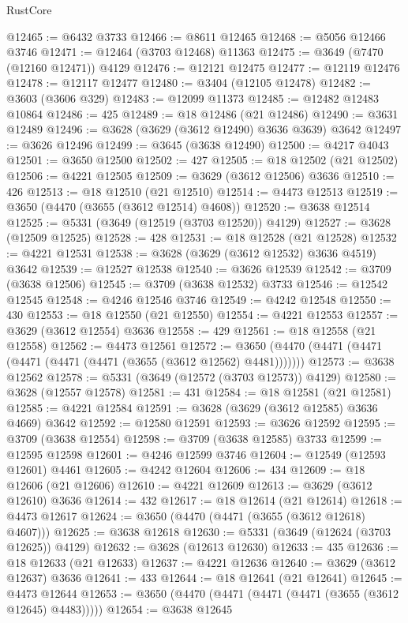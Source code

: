 \begin{lexlean}{RustCore}
\begin{coremodule}
@12465 := @6432 @3733
@12466 := @8611 @12465
@12468 := @5056 @12466 @3746
@12471 := @12464 (@3703 @12468) @11363
@12475 := @3649 (@7470 (@12160 @12471)) @4129
@12476 := @12121 @12475
@12477 := @12119 @12476
@12478 := @12117 @12477
@12480 := @3404 (@12105 @12478)
@12482 := @3603 (@3606 @329)
@12483 := @12099 @11373
@12485 := @12482 @12483 @10864
@12486 := 425
@12489 := @18 @12486 (@21 @12486)
@12490 := @3631 @12489
@12496 := @3628 (@3629 (@3612 @12490) @3636 @3639) @3642
@12497 := @3626 @12496
@12499 := @3645 (@3638 @12490)
@12500 := @4217 @4043
@12501 := @3650 @12500
@12502 := 427
@12505 := @18 @12502 (@21 @12502)
@12506 := @4221 @12505
@12509 := @3629 (@3612 @12506) @3636
@12510 := 426
@12513 := @18 @12510 (@21 @12510)
@12514 := @4473 @12513
@12519 := @3650 (@4470 (@3655 (@3612 @12514) @4608))
@12520 := @3638 @12514
@12525 := @5331 (@3649 (@12519 (@3703 @12520)) @4129)
@12527 := @3628 (@12509 @12525)
@12528 := 428
@12531 := @18 @12528 (@21 @12528)
@12532 := @4221 @12531
@12538 := @3628 (@3629 (@3612 @12532) @3636 @4519) @3642
@12539 := @12527 @12538
@12540 := @3626 @12539
@12542 := @3709 (@3638 @12506)
@12545 := @3709 (@3638 @12532) @3733
@12546 := @12542 @12545
@12548 := @4246 @12546 @3746
@12549 := @4242 @12548
@12550 := 430
@12553 := @18 @12550 (@21 @12550)
@12554 := @4221 @12553
@12557 := @3629 (@3612 @12554) @3636
@12558 := 429
@12561 := @18 @12558 (@21 @12558)
@12562 := @4473 @12561
@12572 := @3650 (@4470 (@4471 (@4471 (@4471 (@4471 (@4471 (@3655 (@3612 @12562) @4481)))))))
@12573 := @3638 @12562
@12578 := @5331 (@3649 (@12572 (@3703 @12573)) @4129)
@12580 := @3628 (@12557 @12578)
@12581 := 431
@12584 := @18 @12581 (@21 @12581)
@12585 := @4221 @12584
@12591 := @3628 (@3629 (@3612 @12585) @3636 @4669) @3642
@12592 := @12580 @12591
@12593 := @3626 @12592
@12595 := @3709 (@3638 @12554)
@12598 := @3709 (@3638 @12585) @3733
@12599 := @12595 @12598
@12601 := @4246 @12599 @3746
@12604 := @12549 (@12593 @12601) @4461
@12605 := @4242 @12604
@12606 := 434
@12609 := @18 @12606 (@21 @12606)
@12610 := @4221 @12609
@12613 := @3629 (@3612 @12610) @3636
@12614 := 432
@12617 := @18 @12614 (@21 @12614)
@12618 := @4473 @12617
@12624 := @3650 (@4470 (@4471 (@3655 (@3612 @12618) @4607)))
@12625 := @3638 @12618
@12630 := @5331 (@3649 (@12624 (@3703 @12625)) @4129)
@12632 := @3628 (@12613 @12630)
@12633 := 435
@12636 := @18 @12633 (@21 @12633)
@12637 := @4221 @12636
@12640 := @3629 (@3612 @12637) @3636
@12641 := 433
@12644 := @18 @12641 (@21 @12641)
@12645 := @4473 @12644
@12653 := @3650 (@4470 (@4471 (@4471 (@4471 (@3655 (@3612 @12645) @4483)))))
@12654 := @3638 @12645

\end{coremodule}
\end{lexlean}
